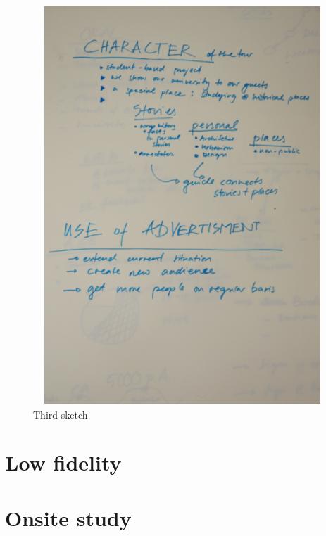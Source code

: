 \begin{figure}[H]
    \centering
    \includegraphics[width=12cm,height=15cm]{Appendices/4/sk3}%
    \caption{Third sketch}%
    \label{fig:Sk3}%
\end{figure}


\section {Low fidelity}
\label{AppendixC} 
\setcounter{figure}{0}




\section {Onsite study}
\label{AppendixD} 
\setcounter{figure}{0}




